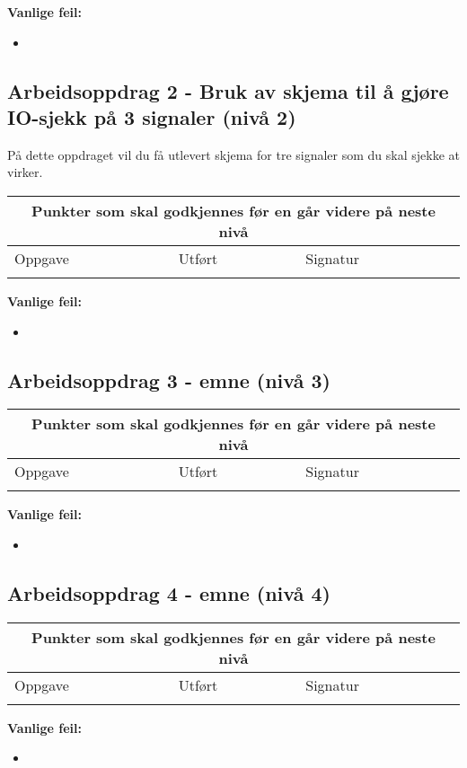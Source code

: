 \textbf{Vanlige feil:}
\begin{itemize}[noitemsep]
	\item 
\end{itemize}
\newpage
\subsection*{Arbeidsoppdrag 2 - Bruk av skjema til å gjøre IO-sjekk på 3 signaler (nivå 2)}

På dette oppdraget vil du få utlevert skjema for tre signaler som du skal sjekke at virker. 

\begin{center}
\begin{tabular}{ | m{12cm} | m{1cm}| m{2cm} | } 
\hline
\multicolumn{3}{|c|}{Punkter som skal godkjennes før en går videre på neste nivå} \\
	\hline
	Oppgave	& Utført & Signatur \\ 
	\hline
& & \\ 
	\hline
\end{tabular}
\end{center}
\textbf{Vanlige feil:}
\begin{itemize}[noitemsep]
	\item 
\end{itemize}
\newpage
\subsection*{Arbeidsoppdrag 3 - emne (nivå 3)}

\begin{center}
\begin{tabular}{ | m{8cm} | m{1cm}| m{2cm} | } 
\hline
\multicolumn{3}{|c|}{Punkter som skal godkjennes før en går videre på neste nivå} \\
	\hline
	Oppgave	& Utført & Signatur \\ 
	\hline
& & \\ 
	\hline
\end{tabular}
\end{center}
\textbf{Vanlige feil:}
\begin{itemize}[noitemsep]
	\item 
\end{itemize}
\newpage

\subsection*{Arbeidsoppdrag 4 - emne (nivå 4)}
\begin{center}
\begin{tabular}{ | m{8cm} | m{1cm}| m{2cm} | } 
\hline
\multicolumn{3}{|c|}{Punkter som skal godkjennes før en går videre på neste nivå} \\
	\hline
	Oppgave	& Utført & Signatur \\ 
	\hline
& & \\ 
	\hline
\end{tabular}
\end{center}
\textbf{Vanlige feil:}
\begin{itemize}[noitemsep]
	\item 
\end{itemize}
\newpage




